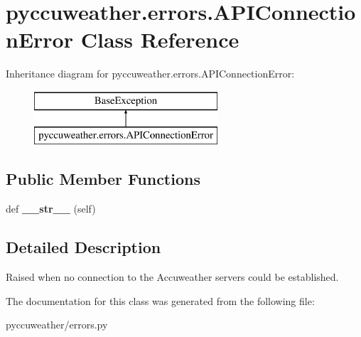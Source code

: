 \hypertarget{classpyccuweather_1_1errors_1_1_a_p_i_connection_error}{}\section{pyccuweather.\+errors.\+A\+P\+I\+Connection\+Error Class Reference}
\label{classpyccuweather_1_1errors_1_1_a_p_i_connection_error}
Inheritance diagram for pyccuweather.\+errors.\+A\+P\+I\+Connection\+Error\+:\begin{figure}[H]
\begin{center}
\leavevmode
\includegraphics[height=2.000000cm]{classpyccuweather_1_1errors_1_1_a_p_i_connection_error}
\end{center}
\end{figure}
\subsection*{Public Member Functions}
\begin{DoxyCompactItemize}
\item 
\hypertarget{classpyccuweather_1_1errors_1_1_a_p_i_connection_error_a515e0937a6f37a9b3d5f76477d1feb09}{}def {\bfseries \+\_\+\+\_\+str\+\_\+\+\_\+} (self)\label{classpyccuweather_1_1errors_1_1_a_p_i_connection_error_a515e0937a6f37a9b3d5f76477d1feb09}

\end{DoxyCompactItemize}


\subsection{Detailed Description}
\begin{DoxyVerb}Raised when no connection to the Accuweather servers could be established.
\end{DoxyVerb}
 

The documentation for this class was generated from the following file\+:\begin{DoxyCompactItemize}
\item 
pyccuweather/errors.\+py\end{DoxyCompactItemize}
